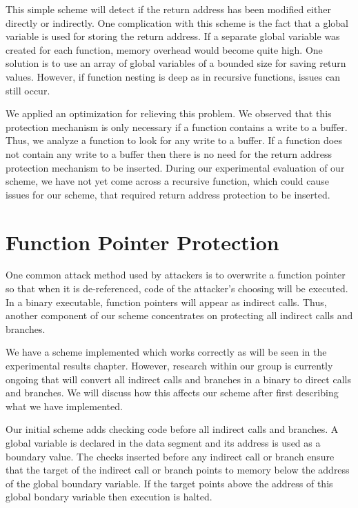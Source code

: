 This simple scheme will detect if the return address has been modified either directly or
indirectly. One complication with this scheme is the fact that a global variable is used for storing
the return address. If a separate global variable was created for each function, memory overhead
would become quite high. One solution is to use an array of global variables of a bounded size for
saving return values. However, if function nesting is deep as in recursive functions, issues can
still occur.

We applied an optimization for relieving this problem. We observed that this protection mechanism is
only necessary if a function contains a write to a buffer. Thus, we analyze a function to look for
any write to a buffer. If a function does not contain any write to a buffer then there is no need
for the return address protection mechanism to be inserted. During our experimental evaluation of
our scheme, we have not yet come across a recursive function, which could cause issues for our
scheme, that required return address protection to be inserted.

\section{Function Pointer Protection}

One common attack method used by attackers is to overwrite a function pointer so that when it is
de-referenced, code of the attacker's choosing will be executed. In a binary executable, function
pointers will appear as indirect calls. Thus, another component of our scheme concentrates on
protecting all indirect calls and branches.

We have a scheme implemented which works correctly as will be seen in the experimental results
chapter. However, research within our group is currently ongoing that will convert all indirect
calls and branches in a binary to direct calls and branches. We will discuss how this affects our
scheme after first describing what we have implemented.

Our initial scheme adds checking code before all indirect calls and branches. A global variable is
declared in the data segment and its address is used as a boundary value. The checks inserted before
any indirect call or branch ensure that the target of the indirect call or branch points to memory
below the address of the global boundary variable. If the target points above the address of this
global bondary variable then execution is halted.

